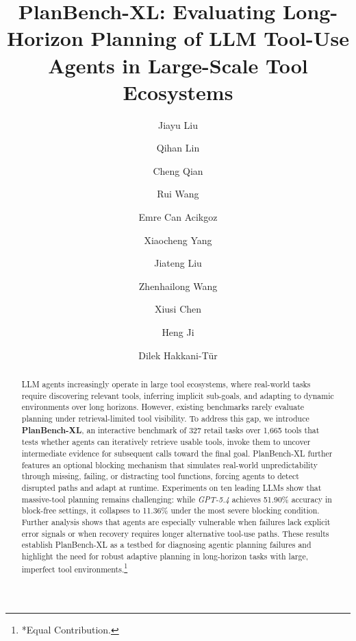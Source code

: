 \documentclass{llmxive}
\title{\textbf{PlanBench-XL}: Evaluating Long-Horizon Planning of LLM Tool-Use Agents in Large-Scale Tool Ecosystems}
\author{Jiayu Liu \and Qihan Lin \and Cheng Qian \and Rui Wang \and Emre Can Acikgoz \and Xiaocheng Yang \and Jiateng Liu \and Zhenhailong Wang \and Xiusi Chen \and Heng Ji \and Dilek Hakkani-Tür}
\providecommand{\BENCH}[1]{\textbf{PlanBench-XL}}
\providecommand{\bench}[1]{PlanBench-XL}
\begin{document}
\maketitle
\begin{abstract}

LLM agents increasingly operate in large tool ecosystems, where real-world tasks require discovering relevant tools, inferring implicit sub-goals, and adapting to dynamic environments over long horizons.
However, existing benchmarks rarely evaluate planning under retrieval-limited tool visibility.
To address this gap, we introduce \BENCH{}, an interactive benchmark of 327 retail tasks over 1,665 tools that tests whether agents can iteratively retrieve usable tools, invoke them to uncover intermediate evidence for subsequent calls toward the final goal.
\bench{} further features an optional blocking mechanism that simulates real-world unpredictability through missing, failing, or distracting tool functions, forcing agents to detect disrupted paths and adapt at runtime.
Experiments on ten leading LLMs show that massive-tool planning remains challenging: while \textit{GPT-5.4} achieves 51.90\% accuracy in block-free settings, it collapses to 11.36\% under the most severe blocking condition.
Further analysis shows that agents are especially vulnerable when failures lack explicit error signals or when recovery requires longer alternative tool-use paths.
These results establish \bench{} as a testbed for diagnosing agentic planning failures and highlight the need for robust adaptive planning in long-horizon tasks with large, imperfect tool environments.\footnote{*Equal Contribution.}



\end{abstract}
\end{document}
